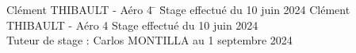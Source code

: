 \begin{titlepage}
    \begin{tabbing}
        Clément THIBAULT - Aéro 4 \= \hspace{6cm} \= Stage effectué du 10 juin 2024 \kill
        Clément THIBAULT - Aéro 4 \> \> Stage effectué du 10 juin 2024 \\
        Tuteur de stage : Carlos MONTILLA \> \> au 1 septembre 2024
    \end{tabbing}
    \vspace*{1cm}


\end{titlepage}